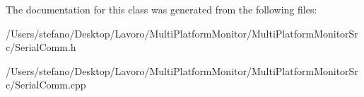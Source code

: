 The documentation for this class was generated from the following files:\begin{CompactItemize}
\item 
/Users/stefano/Desktop/Lavoro/MultiPlatformMonitor/MultiPlatformMonitorSrc/SerialComm.h\item 
/Users/stefano/Desktop/Lavoro/MultiPlatformMonitor/MultiPlatformMonitorSrc/SerialComm.cpp\end{CompactItemize}
